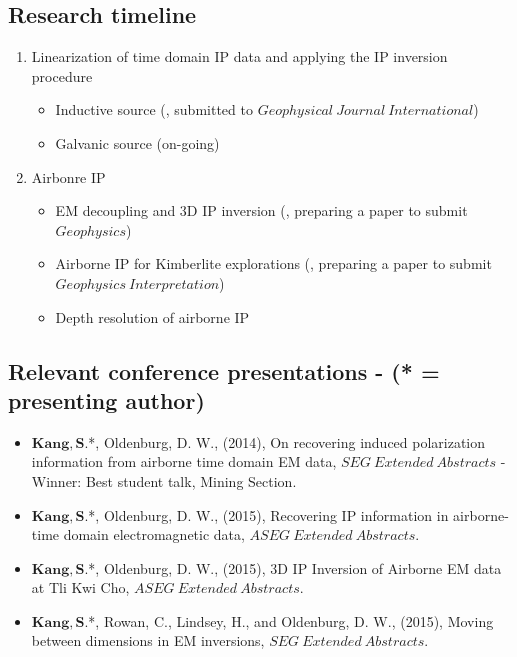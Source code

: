 \documentclass[letterpaper,11pt]{article}
\begin{document}
\subsection{Research timeline}
\begin{enumerate}
  \item Linearization of time domain IP data and applying the IP inversion procedure
  \begin{itemize}
    \item Inductive source (\cite{Kang2015c}, submitted to $\mathit Geophysical \ Journal \ International$)
    \item Galvanic source (on-going)
  \end{itemize}
  \item Airbonre IP
  \begin{itemize}
    \item EM decoupling and 3D IP inversion (\cite{Kang2015a}, preparing a paper to submit $\mathit Geophysics$)
    \item Airborne IP for Kimberlite explorations (\cite{Kang2015b}, preparing a paper to submit $\mathit Geophysics \ Interpretation$)
    \item Depth resolution of airborne IP
  \end{itemize}  
\end{enumerate}
\subsection{Relevant conference presentations - (* = presenting author)}
\begin{itemize}
\item
$\mathbf{Kang, S.}$*, Oldenburg, D. W., (2014), On recovering induced polarization information from airborne time domain EM data, $SEG \ Extended \ Abstracts$ - Winner: Best student talk, Mining Section.
\item
$\mathbf{Kang, S.}$*, Oldenburg, D. W., (2015), Recovering IP information in airborne-time domain electromagnetic data, $ASEG \ Extended \ Abstracts$.
\item
$\mathbf{Kang, S.}$*, Oldenburg, D. W., (2015), 3D IP Inversion of Airborne EM data at Tli Kwi Cho, $ASEG \ Extended \ Abstracts$.
\item
$\mathbf{Kang, S.}$*, Rowan, C., Lindsey, H., and Oldenburg, D. W., (2015), Moving between dimensions in EM inversions, $SEG \ Extended \ Abstracts$.
\end{itemize}
\end{document}
